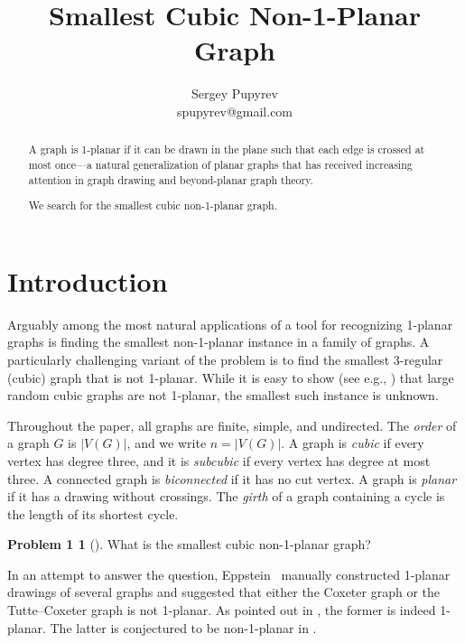 \documentclass[a4paper,11pt]{article}
\title{Smallest Cubic Non-1-Planar Graph}
\theoremstyle{plain}
\theoremstyle{definition}  %
\begin{document}
\author{
    Sergey Pupyrev \\
    spupyrev@gmail.com
}

\date{}
\maketitle

\begin{abstract}
    A graph
    is 1-planar if it can be drawn in the plane such that each edge is crossed at most
    once---a natural generalization of planar graphs that has received increasing
    attention in graph drawing and beyond-planar graph theory.

    We search for the smallest cubic non-1-planar graph.
\end{abstract}

\section{Introduction}

Arguably among the most natural applications of a tool for recognizing 1-planar graphs is
finding the smallest non-1-planar instance in a family of graphs.
A particularly challenging variant of the problem is to
find the smallest 3-regular (cubic) graph that is not 1-planar. While it is easy to show
(see e.g., \cite{DKMW08}) that large random cubic graphs are not 1-planar, the
smallest such instance is unknown.

Throughout the paper, all graphs are finite, simple, and undirected.  The
\emph{order} of a graph $G$ is $|V(G)|$, and we write $n=|V(G)|$.  A graph is
\emph{cubic} if every vertex has degree three, and it is \emph{subcubic} if
every vertex has degree at most three.  A connected graph is
\emph{biconnected} if it has no cut vertex.  A graph is \emph{planar} if it
has a drawing without crossings.  The \emph{girth} of a graph containing a
cycle is the length of its shortest cycle.

\newtheorem*{problem1b}{Problem 1}
\begin{problem1b}[\cite{11011110_cubic,mathse_cubic,oops}]
    What is the smallest cubic non-1-planar graph?
\end{problem1b}

In an attempt to answer the question, Eppstein~\cite{11011110_cubic} manually constructed 1-planar
drawings of several graphs and suggested that either the Coxeter graph or the Tutte--Coxeter graph
is not 1-planar. As pointed out in \cite{oops}, the former is indeed 1-planar.
The latter is conjectured to be non-1-planar in \cite{oops}.
\end{document}
